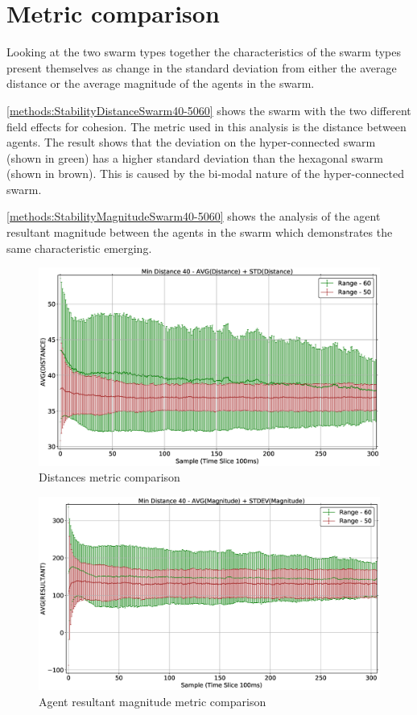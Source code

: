 \section{Metric comparison\label{section:stabilityComparison}}
Looking at the two swarm types together the characteristics of the swarm types present themselves as change in the standard deviation from either the average distance or the average magnitude of the agents in the swarm.

\autoref{methods:StabilityDistanceSwarm40-5060} shows the swarm with the two different field effects for cohesion. The metric used in this analysis is the distance between agents. The result shows that the deviation on the hyper-connected swarm (shown in green) has a higher standard deviation than the hexagonal swarm (shown in brown). This is caused by the bi-modal nature of the hyper-connected swarm.

\autoref{methods:StabilityMagnitudeSwarm40-5060} shows the analysis of the agent resultant magnitude between the agents in the swarm which demonstrates the same characteristic emerging.
\begin{figure}[H]
\begin{center}
\includegraphics[width=13cm]{CHAPTER-5/figures/StabilityDistanceSwarm40-5060}
\end{center}
\caption{Distances metric comparison\label{methods:StabilityDistanceSwarm40-5060}}
\end{figure}
\begin{figure}[H]
\begin{center}
\includegraphics[width=13cm]{CHAPTER-5/figures/StabilityMagnitudeSwarm40-5060}
\end{center}
\caption{Agent resultant magnitude metric comparison\label{methods:StabilityMagnitudeSwarm40-5060}}
\end{figure}

